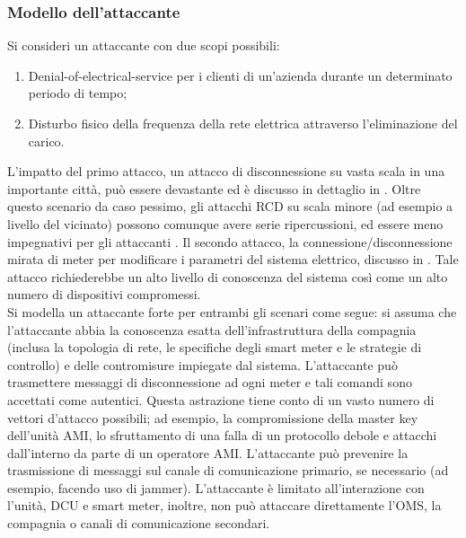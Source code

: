 \subsubsection{Modello dell'attaccante}
Si consideri un attaccante con due scopi possibili:
\begin{enumerate}
	\item Denial-of-electrical-service per i clienti di un'azienda durante un determinato periodo di tempo;
	\item Disturbo fisico della frequenza della rete elettrica attraverso l'eliminazione del carico.
\end{enumerate}
L'impatto del primo attacco, un attacco di disconnessione su vasta scala in una importante città, può essere devastante ed è discusso in dettaglio in \cite{offswitch}. Oltre questo scenario da caso pessimo, gli attacchi RCD su scala minore (ad esempio a livello del vicinato) possono comunque avere serie ripercussioni, ed essere meno impegnativi per gli attaccanti \cite{amithreats}. Il secondo attacco, la connessione/disconnessione mirata di meter per modificare i parametri del sistema elettrico, discusso in \cite{remotecontrol}. Tale attacco richiederebbe un alto livello di conoscenza del sistema così come un alto numero di dispositivi compromessi.\\
Si modella un attaccante forte per entrambi gli scenari come segue: si assuma che l'attaccante abbia la conoscenza esatta dell'infrastruttura della compagnia (inclusa la topologia di rete, le specifiche degli smart meter e le strategie di controllo) e delle contromisure impiegate dal sistema. L'attaccante può trasmettere messaggi di disconnessione ad ogni meter e tali comandi sono accettati come autentici. Questa astrazione tiene conto di un vasto numero di vettori d'attacco possibili; ad esempio, la compromissione della master key dell'unità AMI, lo sfruttamento di una falla di un protocollo debole e attacchi dall'interno da parte di un operatore AMI. L'attaccante può prevenire la trasmissione di messaggi sul canale di comunicazione primario, se necessario (ad esempio, facendo uso di jammer). L'attaccante è limitato all'interazione con l'unità, DCU e smart meter, inoltre, non può attaccare direttamente l'OMS, la compagnia o canali di comunicazione secondari.
